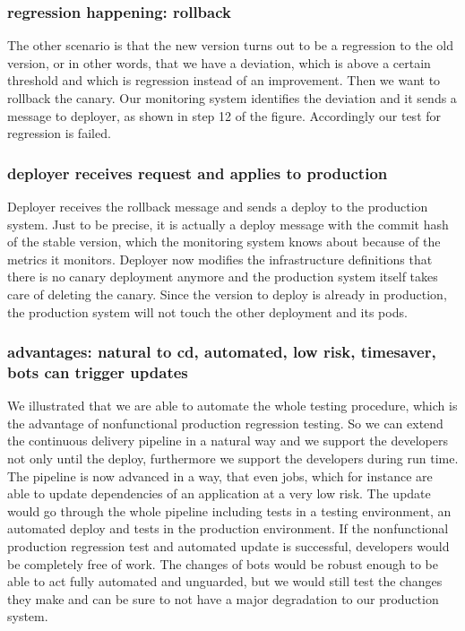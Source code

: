 \subsubsection{regression happening: rollback}
The other scenario is that the new version turns out to be a regression to the old
version, or in other words, that we have a deviation, which is above a certain threshold
and which is regression instead of an improvement. Then we want to rollback the
canary. Our monitoring system identifies the deviation and it sends a message to deployer,
as shown in step 12 of the figure. Accordingly our test for regression is failed.

\subsubsection{deployer receives request and applies to production}
Deployer receives the rollback message and sends a deploy to the production system. Just
to be precise, it is actually a deploy message with the commit hash of the stable version,
which the monitoring system knows about because of the metrics it monitors. Deployer now
modifies the infrastructure definitions that there is no canary deployment anymore and the
production system itself takes care of deleting the canary. Since the version to deploy is
already in production, the production system will not touch the other deployment and its
pods.

\subsubsection{advantages: natural to cd, automated, low risk, timesaver, bots can trigger updates}
We illustrated that we are able to automate the whole testing procedure, which is the
advantage of nonfunctional production regression testing. So we can extend the continuous
delivery pipeline in a natural way and we support the developers not only until the
deploy, furthermore we support the developers during run time. The pipeline is now
advanced in a way, that even jobs, which for instance are able to update dependencies of
an application at a very low risk. The update would go through the whole pipeline
including tests in a testing environment, an automated deploy and tests in the production
environment. If the nonfunctional production regression test and automated update is
successful, developers would be completely free of work. The changes of bots would be
robust enough to be able to act fully automated and unguarded, but we would still test the
changes they make and can be sure to not have a major degradation to our production
system.

